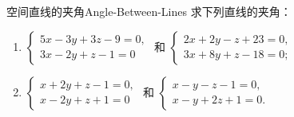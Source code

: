 \begin{problem}{空间直线的夹角}{Angle-Between-Lines}
    求下列直线的夹角：
    \begin{enumerate}
        \item $\begin{cases} 5x - 3y + 3z - 9 = 0, \\ 3x - 2y + z - 1 = 0 \end{cases}$ 和 $\begin{cases} 2x + 2y - z + 23 = 0, \\ 3x + 8y + z - 18 = 0; \end{cases}$
        \item $\begin{cases} x + 2y + z - 1 = 0, \\ x - 2y + z + 1 = 0 \end{cases}$ 和 $\begin{cases} x - y - z - 1 = 0, \\ x - y + 2z + 1 = 0. \end{cases}$
    \end{enumerate}
\end{problem}

